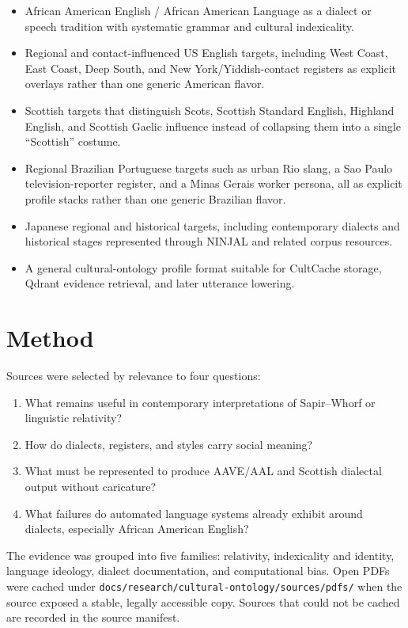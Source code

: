 \documentclass[11pt]{article}
\begin{document}
\begin{itemize}[noitemsep]
  \item African American English / African American Language as a dialect or
  speech tradition with systematic grammar and cultural indexicality.
  \item Regional and contact-influenced US English targets, including West
  Coast, East Coast, Deep South, and New York/Yiddish-contact registers as
  explicit overlays rather than one generic American flavor.
  \item Scottish targets that distinguish Scots, Scottish Standard English,
  Highland English, and Scottish Gaelic influence instead of collapsing them
  into a single ``Scottish'' costume.
  \item Regional Brazilian Portuguese targets such as urban Rio slang, a Sao
  Paulo television-reporter register, and a Minas Gerais worker persona, all as
  explicit profile stacks rather than one generic Brazilian flavor.
  \item Japanese regional and historical targets, including contemporary
  dialects and historical stages represented through NINJAL and related corpus
  resources.
  \item A general cultural-ontology profile format suitable for CultCache
  storage, Qdrant evidence retrieval, and later utterance lowering.
\end{itemize}

\section{Method}

Sources were selected by relevance to four questions:

\begin{enumerate}[noitemsep]
  \item What remains useful in contemporary interpretations of Sapir--Whorf or
  linguistic relativity?
  \item How do dialects, registers, and styles carry social meaning?
  \item What must be represented to produce AAVE/AAL and Scottish dialectal
  output without caricature?
  \item What failures do automated language systems already exhibit around
  dialects, especially African American English?
\end{enumerate}

The evidence was grouped into five families: relativity, indexicality and
identity, language ideology, dialect documentation, and computational bias.
Open PDFs were cached under
\texttt{docs/research/cultural-ontology/sources/pdfs/} when the source exposed a
stable, legally accessible copy. Sources that could not be cached are recorded
in the source manifest.
\end{document}
